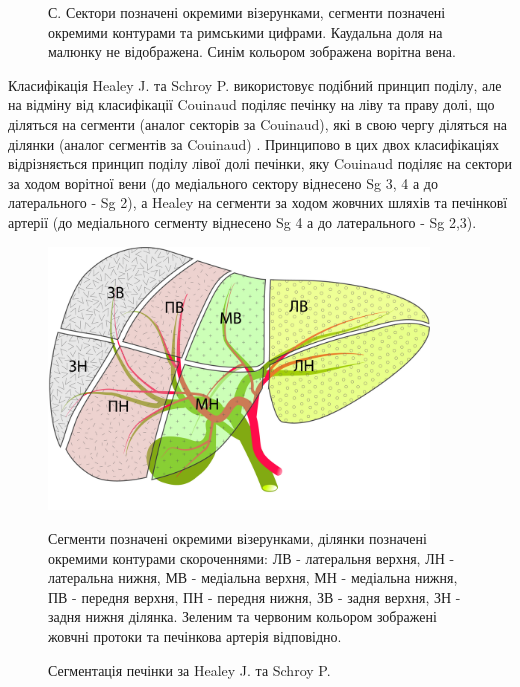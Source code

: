 \begin{refsection}
\begin{figure}[h]
\medskip
\small
С. Сектори позначені окремими візерунками, сегменти позначені окремими контурами та римськими цифрами. Каудальна доля на малюнку не відображена. Синім кольором зображена ворітна вена.

\end{figure}

Класифікація Healey J. та Schroy P. використовує подібний принцип поділу, але на відміну від класифікації Couinaud поділяє печінку на ліву та праву долі, що діляться на сегменти (аналог секторів за Couinaud), які в свою чергу діляться на ділянки (аналог сегментів за Couinaud) \cite{HEALEY1953}. Принципово в цих двох класифікаціях відрізняється принцип поділу лівої долі печінки, яку Couinaud поділяє на сектори за ходом ворітної вени (до медіального сектору віднесено Sg 3, 4 а до латерального -  Sg 2), а Healey на сегменти за ходом жовчних шляхів та печінковї артерії (до медіального сегменту віднесено Sg 4 а до латерального - Sg 2,3).  

\begin{figure}[h]
\caption{Сегментація печінки за Healey J. та Schroy P.}

\includegraphics[width=0.9\textwidth]{Illustrations/Chapter_01/Healey.jpg}
\label{fig:Healey}

\medskip
\small
Сегменти позначені окремими візерунками, ділянки позначені окремими контурами скороченнями: ЛВ - латеральня верхня, ЛН - латеральна нижня, МВ - медіальна верхня, МН - медіальна нижня, ПВ - передня верхня, ПН - передня нижня, ЗВ - задня верхня, ЗН - задня нижня ділянка. Зеленим та червоним кольором зображені жовчні протоки та печінкова артерія відповідно.
\end{figure}


\end{refsection}
